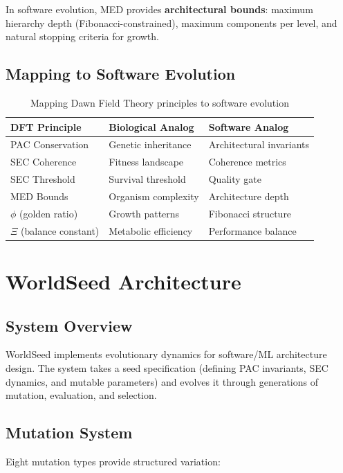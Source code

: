 \documentclass[11pt,a4paper]{article}
\begin{document}
In software evolution, MED provides \textbf{architectural bounds}: maximum hierarchy depth (Fibonacci-constrained), maximum components per level, and natural stopping criteria for growth.

\subsection{Mapping to Software Evolution}

\begin{table}[H]
\centering
\begin{tabular}{lll}
\toprule
\textbf{DFT Principle} & \textbf{Biological Analog} & \textbf{Software Analog} \\
\midrule
PAC Conservation & Genetic inheritance & Architectural invariants \\
SEC Coherence & Fitness landscape & Coherence metrics \\
SEC Threshold & Survival threshold & Quality gate \\
MED Bounds & Organism complexity & Architecture depth \\
$\phi$ (golden ratio) & Growth patterns & Fibonacci structure \\
$\Xi$ (balance constant) & Metabolic efficiency & Performance balance \\
\bottomrule
\end{tabular}
\caption{Mapping Dawn Field Theory principles to software evolution}
\end{table}

\section{WorldSeed Architecture}

\subsection{System Overview}

WorldSeed implements evolutionary dynamics for software/ML architecture design. The system takes a seed specification (defining PAC invariants, SEC dynamics, and mutable parameters) and evolves it through generations of mutation, evaluation, and selection.

\subsection{Mutation System}

Eight mutation types provide structured variation:
\end{document}
